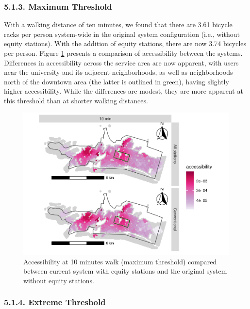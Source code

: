 \documentclass[]{elsarticle} %
\begin{document}
\hypertarget{maximum-threshold}{%
\subsubsection{5.1.3. Maximum Threshold}\label{maximum-threshold}}

With a walking distance of ten minutes, we found that there are 3.61
bicycle racks per person system-wide in the original system
configuration (i.e., without equity stations). With the addition of
equity stations, there are now 3.74 bicycles per person. Figure
\ref{fig:figure-8} presents a comparison of accessibility between the
systems. Differences in accessibility across the service area are now
apparent, with users near the university and its adjacent neighborhoods,
as well as neighborhoods north of the downtown area (the latter is
outlined in green), having slightly higher accessibility. While the
differences are modest, they are more apparent at this threshold than at
shorter walking distances.

\begin{figure}

{\centering \includegraphics[width=0.9\linewidth]{Bike-share-spatial-equity_files/figure-latex/figure-8-1} 

}

\caption{Accessibility at 10 minutes walk (maximum threshold) compared between current system with equity stations and the original system without equity stations.}\label{fig:figure-8}
\end{figure}

\hypertarget{extreme-threshold}{%
\subsubsection{5.1.4. Extreme Threshold}\label{extreme-threshold}}
\end{document}

